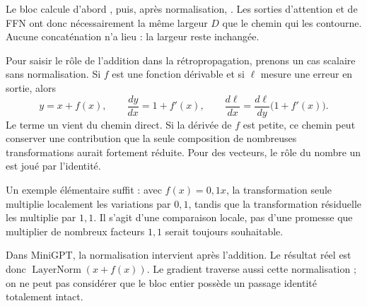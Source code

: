 
Le bloc calcule d'abord , puis, après normalisation, . Les sorties d'attention et de FFN ont donc nécessairement la même largeur $D$ que le chemin qui les contourne. Aucune concaténation n'a lieu : la largeur reste inchangée.

Pour saisir le rôle de l'addition dans la rétropropagation, prenons un cas scalaire sans normalisation. Si $f$ est une fonction dérivable et si $\ell$ mesure une erreur en sortie, alors
\[
 y=x+f(x),\qquad
 \frac{dy}{dx}=1+f'(x),\qquad
 \frac{d\ell}{dx}=\frac{d\ell}{dy}\bigl(1+f'(x)\bigr).
\]
Le terme un vient du chemin direct. Si la dérivée de $f$ est petite, ce chemin peut conserver une contribution que la seule composition de nombreuses transformations aurait fortement réduite. Pour des vecteurs, le rôle du nombre un est joué par l'identité.

Un exemple élémentaire suffit : avec $f(x)=0{,}1x$, la transformation seule multiplie localement les variations par $0{,}1$, tandis que la transformation résiduelle les multiplie par $1{,}1$. Il s'agit d'une comparaison locale, pas d'une promesse que multiplier de nombreux facteurs $1{,}1$ serait toujours souhaitable.

Dans MiniGPT, la normalisation intervient après l'addition. Le résultat réel est donc $\operatorname{LayerNorm}(x+f(x))$. Le gradient traverse aussi cette normalisation ; on ne peut pas considérer que le bloc entier possède un passage identité totalement intact.




